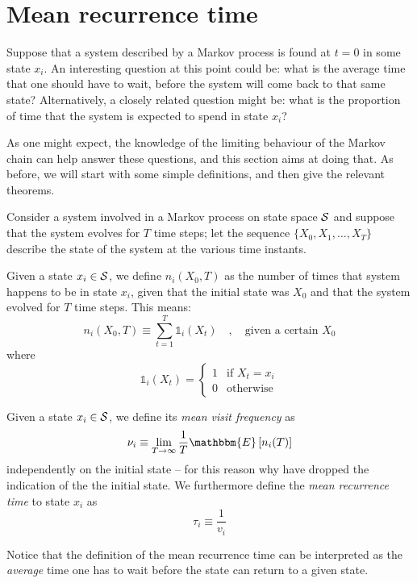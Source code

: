\section{Mean recurrence time}
Suppose that a system described by a Markov process is found at $t = 0$ in some state $x_i$. An interesting question at this point could be: what is the average time that one should have to wait, before the system will come back to that same state? Alternatively, a closely related question might be: what is the proportion of time that the system is expected to spend in state $x_i$?

As one might expect, the knowledge of the limiting behaviour of the Markov chain can help answer these questions, and this section aims at doing that. As before, we will start with some simple definitions, and then give the relevant theorems.

\medskip
Consider a system involved in a Markov process on state space $\mathcal{S}$ and suppose that the system evolves for $T$ time steps; let the sequence $\{X_0, X_1, \dots, X_T\}$ describe the state of the system at the various time instants.
\begin{ndef} 
    Given a state $x_i \in \mathcal{S}$, we define $n_i (X_0, T)$ as the number of times that system happens to be in state $x_i$, given that the initial state was $X_0$ and that the system evolved for $T$ time steps. This means:
    \begin{equation}
        n_i (X_0, T) \equiv \sum_{t = 1}^T \mathbb{1}_i(X_t) \quad , \quad \text{given a certain }X_0
    \end{equation}
    where
    \begin{equation}
        \mathbb{1}_i(X_t) =
        \begin{cases}
            1 & \text{if $X_t = x_i$} \\
            0 & \text{otherwise}
        \end{cases}
    \end{equation}
\end{ndef}
\begin{ndef}  \label{def:nu-tau}
    Given a state $x_i \in \mathcal{S}$, we define its \emph{mean visit frequency} as
    \begin{equation}
        \nu_i \equiv \lim_{T\rightarrow \infty} \frac{1}{T} \mathbbm{E} \left[ n_i (T) \right]
    \end{equation}
    independently on the initial state -- for this reason why have dropped the indication of the the initial state.
    We furthermore define the \emph{mean recurrence time} to state $x_i$ as
    \begin{equation}
        \tau_i \equiv \frac{1}{v_i}
    \end{equation}
\end{ndef}
Notice that the definition of the mean recurrence time can be interpreted as the \emph{average} time one has to wait before the state can return to a given state.

